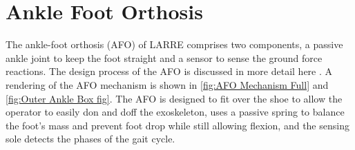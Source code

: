 
\section{Ankle Foot Orthosis}
\label{sec:ankle}

The ankle-foot orthosis (AFO) of LARRE comprises two components, a passive ankle joint to keep the foot straight and a sensor to sense the ground force reactions. The design process of the AFO is discussed in more detail here \cite{Michaels2020}.  A rendering of the AFO mechanism is shown in \autoref{fig:AFO Mechanism Full} and \autoref{fig:Outer Ankle Box fig}. The AFO is designed to fit over the shoe to allow the operator to easily don and doff the exoskeleton, uses a passive spring to balance the foot's mass and prevent foot drop while still allowing flexion, and the sensing sole detects the phases of the gait cycle. 

